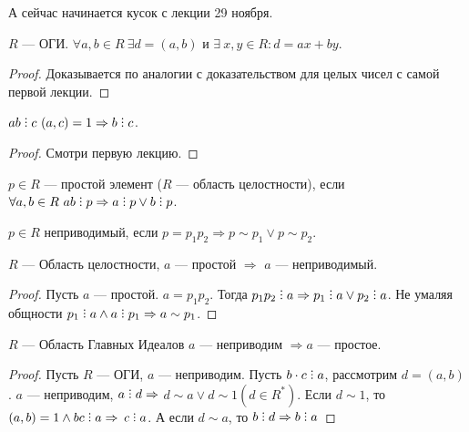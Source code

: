 А сейчас начинается кусок с лекции 29 ноября.
\begin{statement}
    $R$ --- ОГИ.  $\forall a, b \in R \  \exists d = (a, b)$ и  $\exists\!\  x, y \in R: d = ax+by$.
\end{statement}
\begin{proof}
    Доказывается по аналогии с доказательством для целых чисел с самой первой лекции.
\end{proof}
\begin{statement}
    $ab \divby c\ (a, c) = 1 \Rightarrow b \divby c$.
\end{statement}
\begin{proof}
    Смотри первую лекцию.
\end{proof}
\begin{definition}
    $p \in R$ --- простой элемент ($R$ --- область целостности), если $\forall a,b \in R\ ab \divby p \Rightarrow a \divby p \lor b \divby p$.
\end{definition}
\begin{definition}
    $p \in R$ неприводимый, если  $p=p_1p_2 \Rightarrow p \sim p_1 \lor p \sim p_2$.
\end{definition}
\begin{statement}
    $R$ --- Область целостности, $a$ --- простой  $\Rightarrow$  $a$ --- неприводимый.
\end{statement}
\begin{proof}
	Пусть $a$ --- простой.  $a = p_1 p_2$. Тогда $p_1 p_2 \divby a \Rightarrow p_1 \divby a \lor p_2 \divby a$.  Не умаляя общности $p_1 \divby a \land a \divby p_1 \Rightarrow a \sim p_1$. 
\end{proof}

\begin{statement}
     $R$ --- Область Главных Идеалов  $a$ --- неприводим  $\Rightarrow a$ --- простое.
\end{statement}
\begin{proof}
	Пусть $R$ --- ОГИ,  $a$ --- неприводим. Пусть $b \cdot c \divby a$, рассмотрим $d = (a, b)$. $a$ --- неприводим, $a \divby d \Rightarrow$ $d \sim a \lor d \sim 1 (d \in R^*)$. Если $d \sim 1$, то $(a, b) = 1 \land b c \divby a \Rightarrow$ $c \divby a$. А если $d \sim a$, то $b \divby d \Rightarrow b \divby a$
\end{proof}

